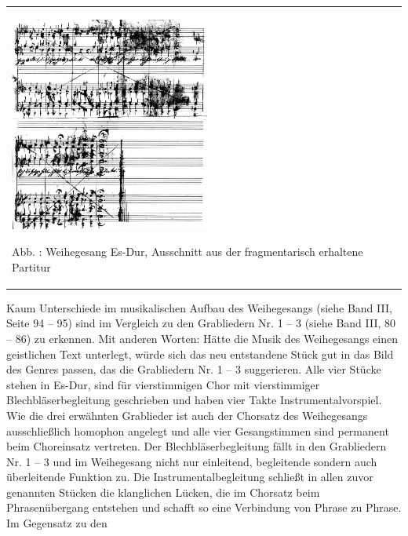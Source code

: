\begin{center}
\begin{minipage}{6.969cm}
\begin{center}
\tablefirsthead{}
\tablehead{}
\tabletail{}
\tablelasttail{}
\begin{supertabular}{m{6.769cm}}

\includegraphics[width=6.588cm,height=7.084cm]{pictures/zulassungsarbeit-img102.png}

Abb. : Weihegesang Es-Dur, Ausschnitt aus der
fragmentarisch erhaltene Partitur\\
\end{supertabular}
\end{center}
\end{minipage}
\end{center}
Kaum Unterschiede im musikalischen Aufbau des Weihegesangs (siehe Band
III, Seite 94 – 95) sind im Vergleich zu den Grabliedern Nr. 1 – 3
(siehe Band III, 80 – 86) zu erkennen. Mit anderen Worten: Hätte die
Musik des Weihegesangs einen geistlichen Text unterlegt, würde sich das
neu entstandene Stück gut in das Bild des Genres passen, das die
Grabliedern Nr. 1 – 3 suggerieren. Alle vier Stücke stehen in Es-Dur,
sind für vierstimmigen Chor mit vierstimmiger Blechbläserbegleitung
geschrieben und haben vier Takte Instrumentalvorspiel. Wie die drei
erwähnten Grablieder ist auch der Chorsatz des Weihegesangs
ausschließlich homophon angelegt und alle vier Gesangstimmen sind
permanent beim Choreinsatz vertreten. Der Blechbläserbegleitung fällt
in den Grabliedern Nr. 1 – 3 und im Weihegesang nicht nur einleitend,
begleitende sondern auch überleitende Funktion zu. Die
Instrumentalbegleitung schließt in allen zuvor genannten Stücken die
klanglichen Lücken, die im Chorsatz beim Phrasenübergang entstehen und
schafft so eine Verbindung von Phrase zu Phrase. Im Gegensatz zu den
